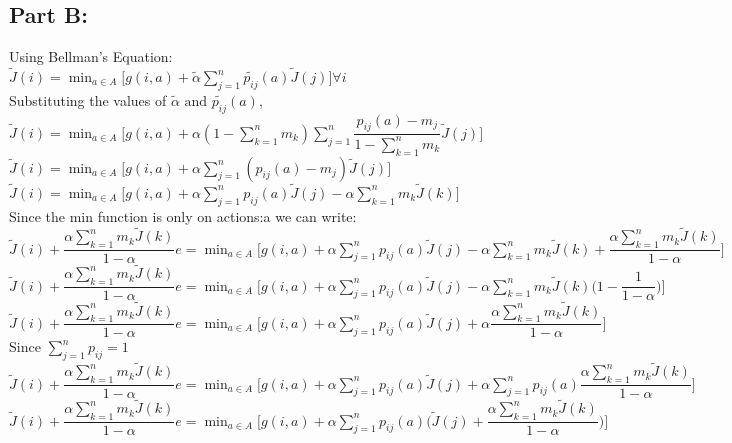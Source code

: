 \documentclass{article}
\begin{document}
\subsection{Part B:}
Using Bellman's Equation:\\
$\tilde{J}(i)=\displaystyle \min_{a \in A} \Big[ g(i,a)+\tilde{\alpha} \displaystyle \sum_{j=1}^{n}\tilde{p_{ij}}(a)\tilde{J}(j)\Big] \forall i$\\
Substituting the values of $\tilde{\alpha} \textrm{ and } \tilde{p_{ij}}(a)$,\\
$\tilde{J}(i)=\displaystyle \min_{a \in A} \Big[ g(i,a)+\alpha(1-\sum_{k=1}^{n}m_k) \displaystyle \sum_{j=1}^{n}\dfrac{p_{ij}(a)-m_j}{1-\sum_{k=1}^{n}m_k}\tilde{J}(j)\Big]$\\
$\tilde{J}(i)=\displaystyle \min_{a \in A} \Big[ g(i,a)+\alpha \displaystyle \sum_{j=1}^{n}({p_{ij}(a)-m_j})\tilde{J}(j)\Big]$\\
$\tilde{J}(i)=\displaystyle \min_{a \in A} \Big[ g(i,a)+\alpha \displaystyle \sum_{j=1}^{n}p_{ij}(a)\tilde{J}(j)-\alpha \displaystyle \sum_{k=1}^{n}m_k\tilde{J}(k)\Big]$\\
Since the min function is only on actions:a we can write:\\
$\tilde{J}(i)+\dfrac{\alpha   \sum_{k=1}^{n}m_k \tilde{J}(k)}{1-\alpha}e=\displaystyle \min_{a \in A} \Big[ g(i,a)+\alpha \displaystyle \sum_{j=1}^{n}p_{ij}(a)\tilde{J}(j)-\alpha \displaystyle \sum_{k=1}^{n}m_k\tilde{J}(k) +\dfrac{\alpha   \sum_{k=1}^{n}m_k \tilde{J}(k)}{1-\alpha}\Big]$\\
$\tilde{J}(i)+\dfrac{\alpha   \sum_{k=1}^{n}m_k \tilde{J}(k)}{1-\alpha}e=\displaystyle \min_{a \in A} \Big[ g(i,a)+\alpha \displaystyle \sum_{j=1}^{n}p_{ij}(a)\tilde{J}(j)-\alpha \displaystyle \sum_{k=1}^{n}m_k\tilde{J}(k) \big(1-\dfrac{1}{1-\alpha}\big)\Big]$\\
$\tilde{J}(i)+\dfrac{\alpha   \sum_{k=1}^{n}m_k \tilde{J}(k)}{1-\alpha}e=\displaystyle \min_{a \in A} \Big[ g(i,a)+\alpha \displaystyle \sum_{j=1}^{n}p_{ij}(a)\tilde{J}(j)+\alpha \dfrac{\alpha   \sum_{k=1}^{n}m_k \tilde{J}(k)}{1-\alpha} \Big]$\\
Since $\displaystyle \sum_{j=1}^{n}p_{ij}=1$\\
$\tilde{J}(i)+\dfrac{\alpha   \sum_{k=1}^{n}m_k \tilde{J}(k)}{1-\alpha}e=\displaystyle \min_{a \in A} \Big[ g(i,a)+\alpha \displaystyle \sum_{j=1}^{n}p_{ij}(a)\tilde{J}(j)+\alpha \displaystyle \sum_{j=1}^{n}p_{ij}(a) \dfrac{\alpha   \sum_{k=1}^{n}m_k \tilde{J}(k)}{1-\alpha} \Big]$\\
$\tilde{J}(i)+\dfrac{\alpha   \sum_{k=1}^{n}m_k \tilde{J}(k)}{1-\alpha}e=\displaystyle \min_{a \in A} \Bigg[ g(i,a)+\alpha \displaystyle \sum_{j=1}^{n}p_{ij}(a)\Big(\tilde{J}(j)+ \dfrac{\alpha   \sum_{k=1}^{n}m_k \tilde{J}(k)}{1-\alpha}\Big) \Bigg]$\\
\end{document}

